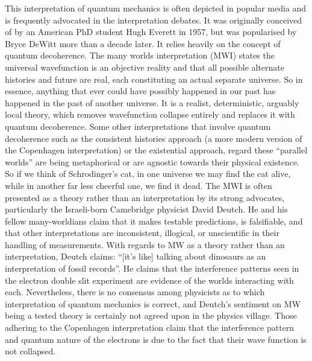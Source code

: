 \documentclass{article}
\begin{document}
This interpretation of quantum mechanics is often depicted in popular media and is frequently advocated in the interpretation debates. It was originally conceived of by an American PhD student Hugh Everett in 1957, but was popularised by Bryce DeWitt more than a decade later. It relies heavily on the concept of quantum decoherence. The many worlds interpretation (MWI) states the universal wavefunction is an objective reality and that all possible alternate histories and future are real, each constituting an actual separate universe. So in essence, anything that ever could have possibly happened in our past has happened in the past of another universe. It is a realist, deterministic, arguably local theory, which removes wavefunction collapse entirely and replaces it with quantum decoherence. Some other interpretations that involve quantum decoherence such as the consistent histories approach (a more modern version of the Copenhagen interpretation) or the existential approach, regard these ``parallel worlds'' are being metaphorical or are agnostic towards their physical existence. So if we think of Schrodinger's cat, in one universe we may find the cat alive, while in another far less cheerful one, we find it dead. The MWI is often presented as a theory rather than an interpretation by its strong advocates, particularly the Israeli-born Camebridge physicist David Deutch. He and his fellow many-worldians claim that it makes testable predictions, is falsifiable, and that other interpretations are inconsistent, illogical, or unscientific in their handling of measurements. With regards to MW as a theory rather than an interpretation, Deutch claims: ``[it's like] talking about dinosaurs as an interpretation of fossil records''. He claims that the interference patterns seen in the electron double slit experiment are evidence of the worlds interacting with each. Nevertheless, there is no consensus among physicists as to which interpretation of quantum mechanics is correct, and Deutch's sentiment on MW being a tested theory is certainly not agreed upon in the physics village. Those adhering to the Copenhagen interpretation claim that the interference pattern and quantum nature of the electrons is due to the fact that their wave function is not collapsed.
\end{document}
